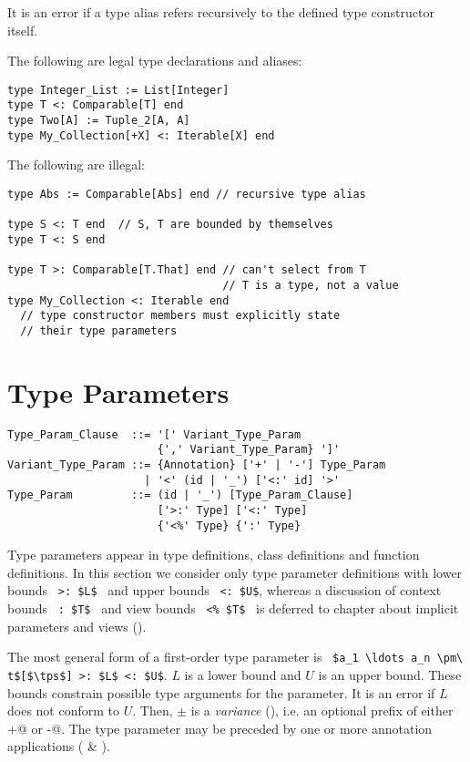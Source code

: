 It is an error if a type alias refers recursively to the defined type constructor itself. 

\example The following are legal type declarations and aliases:
\begin{lstlisting}
type Integer_List := List[Integer]
type T <: Comparable[T] end
type Two[A] := Tuple_2[A, A]
type My_Collection[+X] <: Iterable[X] end
\end{lstlisting}
The following are illegal:
\begin{lstlisting}
type Abs := Comparable[Abs] end // recursive type alias

type S <: T end  // S, T are bounded by themselves
type T <: S end

type T >: Comparable[T.That] end // can't select from T
                                 // T is a type, not a value
type My_Collection <: Iterable end
  // type constructor members must explicitly state
  // their type parameters
\end{lstlisting}






\section{Type Parameters}

\syntax\begin{lstlisting}
Type_Param_Clause  ::= '[' Variant_Type_Param 
                       {',' Variant_Type_Param} ']'
Variant_Type_Param ::= {Annotation} ['+' | '-'] Type_Param
                     | '<' (id | '_') ['<:' id] '>'
Type_Param         ::= (id | '_') [Type_Param_Clause]
                       ['>:' Type] ['<:' Type]
                       {'<%' Type} {':' Type}
\end{lstlisting}

Type parameters appear in type definitions, class definitions and function definitions. In this section we consider only type parameter definitions with lower bounds ~\lstinline!>: $L$!~ and upper bounds ~\lstinline!<: $U$!, whereas a discussion of context bounds ~\lstinline!: $T$!~ and view bounds ~\lstinline!<% $T$!~ is deferred to chapter about implicit parameters and views ().

The most general form of a first-order type parameter is ~\lstinline!$a_1 \ldots a_n \pm\ t$[$\tps$] >: $L$ <: $U$!. $L$ is a lower bound and $U$ is an upper bound. These bounds constrain possible type arguments for the parameter. It is an error if $L$ does not conform to $U$. Then, $\pm$ is a {\em variance} (), i.e. an optional prefix of either \lstinline@+@ or \lstinline@-@. The type parameter may be preceded by one or more annotation applications ( \& ).

